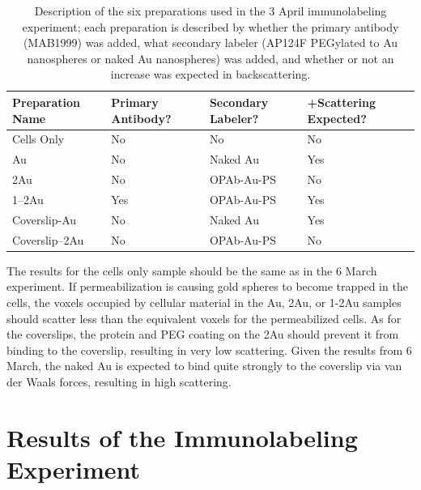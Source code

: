 \begin{table}[htb]
\caption{Description of the six preparations used in the 3 April immunolabeling experiment; each preparation is described by whether the primary antibody (MAB1999) was added, what secondary labeler (AP124F PEGylated to Au nanospheres or naked Au nanospheres) was added, and whether or not an increase was expected in backscattering.}
\begin{minipage}{\linewidth}
\setlength{\tymax}{0.5\linewidth}
\centering
\small
\begin{tabular}{lp{2cm}p{2cm}p{2cm}} \toprule
Preparation Name&Primary Antibody?&Secondary Labeler?&+Scattering Expected?\\
\midrule
Cells Only&No&No&No\\
Au&No&Naked Au&Yes\\
2Au&No&OPAb-Au-PS&No\\
1--2Au&Yes&OPAb-Au-PS&Yes\\
Coverslip-Au&No&Naked Au&Yes\\
Coverslip--2Au&No&OPAb-Au-PS&No\\

\bottomrule

\end{tabular}
\end{minipage}
\label{tab:3AprilPrepTable}
\end{table}

The results for the cells only sample should be the same as in the 6 March experiment. If permeabilization is causing gold spheres to become trapped in the cells, the voxels occupied by cellular material in the Au, 2Au, or 1-2Au samples should scatter less than the equivalent voxels for the permeabilized cells. As for the coverslips, the protein and PEG coating on the 2Au should prevent it from binding to the coverslip, resulting in very low scattering. Given the results from 6 March, the naked Au is expected to bind quite strongly to the coverslip via van der Waals forces, resulting in high scattering.

\section{Results of the Immunolabeling Experiment}
\label{resultsoftheimmunolabelingexperiment}

